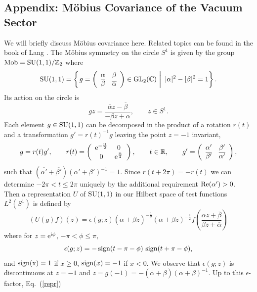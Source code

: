 \documentclass[10pt,a4paper]{article}
\begin{document}
\begin{appendix}
\section{Appendix: M{\"o}bius Covariance of the
Vacuum Sector}
We will briefly discuss M{\"o}bius covariance
here. Related topics can be found in the book
of Lang \cite{Lang}. The M{\"o}bius symmetry on
the circle $S^1$ is given by the group
${\rm Mob}={\rm SU}(1,1)/\mathbb{Z}_2$ where
\[ {\rm SU}(1,1) = \left\{ \left. g= \left(
\begin{array}{cc}
\alpha & \beta \\ \overline{\beta} & \overline{\alpha}
\end{array} \right) \in {\rm GL}_2(\mathbb{C}) \,\,
\right| \,\, |\alpha|^2-|\beta|^2=1 \right\}. \]
Its action on the circle is
\[ gz = \frac{\overline{\alpha}z-\overline{\beta}}{-\beta
z+\alpha}, \qquad z\in S^1. \]
Each element $g\in{\rm SU}(1,1)$ can be decomposed
in the product of a rotation $r(t)$ and a transformation
$g'=r(t)^{-1}g$ leaving the point $z=-1$ invariant,
\[ g=r(t)g',\qquad r(t)= \left( \begin{array}{cc}
{\rm e}^{-\frac{{\rm i} t}{2}} & 0 \\ 0 & {\rm e}^\frac{{\rm i} t}{2}
\end{array} \right), \qquad t\in\mathbb{R},
\qquad g'=\left( \begin{array}{cc}
\alpha' & \beta' \\ \overline{\beta'} &
\overline{\alpha'} \end{array} \right) , \]
such that $(\overline{\alpha'}+\overline{\beta'})
(\alpha'+\beta')^{-1}=1$.
Since $r(t+2\pi)=-r(t)$ we can determine
$-2\pi<t\le 2\pi$ uniquely by the additional
requirement ${\rm Re}(\alpha')>0$. Then a
representation $U$ of ${\rm SU}(1,1)$
in our Hilbert space of test functions $L^2(S^1)$ is
defined by
\begin{equation}
\label{repr}
\left( U (g) f \right) (z) = \epsilon(g;z)
(\alpha + \overline{\beta}
\overline{z})^{-\frac{1}{2}}(\overline{\alpha}
+\beta z)^{-\frac{1}{2}}
f\left( \frac{\alpha z + \overline{\beta}}{\beta z
+ \overline{\alpha}} \right)
\end{equation}
where for $z={\rm e}^{{\rm i}\phi}$, $-\pi<\phi\le\pi$,
\[ \epsilon(g;z) = - \, {\rm sign} (t-\pi-\phi)
\,\, {\rm sign}(t+\pi-\phi), \]
and ${\rm sign(x)}=1$ if $x\ge 0$,
${\rm sign}(x)=-1$ if $x<0$. We observe that
$\epsilon(g;z)$ is discontinuous at $z=-1$
and $z=g(-1)=-(\overline{\alpha}+\overline{\beta})
(\alpha+\beta)^{-1}$.
Up to this $\epsilon$-factor, Eq.~(\ref{repr})

\end{appendix}
\end{document}
